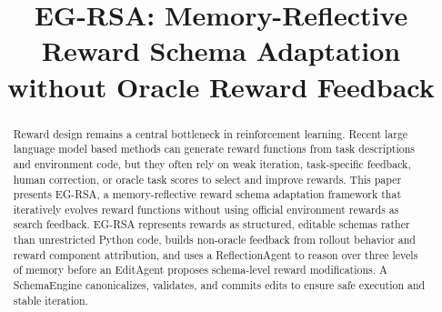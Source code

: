 \documentclass[10pt,conference]{IEEEtran}
\title{EG-RSA: Memory-Reflective Reward Schema Adaptation without Oracle Reward Feedback}
\author{
\IEEEauthorblockN{Anonymous Authors}
\IEEEauthorblockA{Draft for local editing}
}
\newcommand{\methodname}{EG-RSA}
\begin{document}
\maketitle

\begin{abstract}
Reward design remains a central bottleneck in reinforcement learning. Recent large language model based methods can generate reward functions from task descriptions and environment code, but they often rely on weak iteration, task-specific feedback, human correction, or oracle task scores to select and improve rewards. This paper presents \methodname{}, a memory-reflective reward schema adaptation framework that iteratively evolves reward functions without using official environment rewards as search feedback. \methodname{} represents rewards as structured, editable schemas rather than unrestricted Python code, builds non-oracle feedback from rollout behavior and reward component attribution, and uses a ReflectionAgent to reason over three levels of memory before an EditAgent proposes schema-level reward modifications. A SchemaEngine canonicalizes, validates, and commits edits to ensure safe execution and stable iteration.
\end{abstract}







\end{document}
